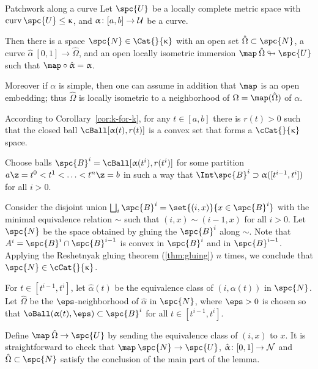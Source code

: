 \begin{thm}{Patchwork along a curve}
\label{lem:patch}
Let $\spc{U}$ be a locally complete metric space with $\curv\spc{U}\le\kappa$, 
and $\alpha\:[a,b]\to\spc{U}$ be a curve.

Then there is a space $\spc{N}\in\Cat{}{\kappa}$
with an open set $\hat\Omega\subset \spc{N}$,
a curve $\hat\alpha\:[0,1]\to\hat\Omega$,
and an open locally isometric immersion 
 $\map\:\hat\Omega\looparrowright\spc{U}$ such that
$\map\circ\hat\alpha=\alpha$.

Moreover if $\alpha$ is simple, then one can assume in addition that $\map$ is an open embedding;
thus $\hat\Omega$ is locally isometric to a neighborhood of $\Omega=\map(\hat\Omega)$ of $\alpha$.
\end{thm}



According to Corollary~\ref{cor:k-for-k},
for any $t\in[a,b]$ there is $r(t)>0$ 
such that the closed ball
$\cBall[\alpha(t),r(t)]$ is a  convex set  that forms a $\cCat{}{\kappa}$ space.

Choose balls $\spc{B}^i=\cBall[\alpha(t^i),r(t^i)]$
for some partition $a\z=t^0<t^1<\dots<t^n\z=b$
in such a way that 
$\Int\spc{B}^i\supset \alpha([t^{i-1},t^i])$ for all $i>0$.

Consider the disjoint union $\bigsqcup_i\spc{B}^i=\set{(i,x)}{x\in\spc{B}^i}$ with the minimal equivalence relation $\sim$ such that $(i,x)\sim(i-1,x)$ for all $i>0$.
Let  $\spc{N}$ be the space obtained by gluing the $\spc{B}^i$ along $\sim$.
Note that $A^i=\spc{B}^i\cap\spc{B}^{i-1}$ is convex in $\spc{B}^i$ and in $\spc{B}^{i-1}$.
Applying the Reshetnyak gluing theorem (\ref{thm:gluing}) $n$ times, 
we conclude that $\spc{N}\in\cCat{}{\kappa}$.


For $t\in[t^{i-1},t^i]$, let $\hat\alpha(t)$  be the equivalence class of $(i,\alpha(t))$ in $\spc{N}$.
Let $\hat\Omega$ be the $\eps$-neighborhood of $\hat\alpha$ in $\spc{N}$, where $\eps>0$ is chosen so that $\oBall(\alpha(t),\eps)\subset\spc{B}^i$ for all $t\in[t^{i-1},t^i]$.

Define $\map\:\hat\Omega\to\spc{U}$
by sending the equivalence class of $(i,x)$ to $x$.
It is straightforward to check that $\map\:\spc{N}\to\spc{U}$, $\hat\alpha\:[0,1]\to\spc{N}$ and $\hat\Omega\subset\spc{N}$ satisfy the conclusion of the main part of the lemma.

